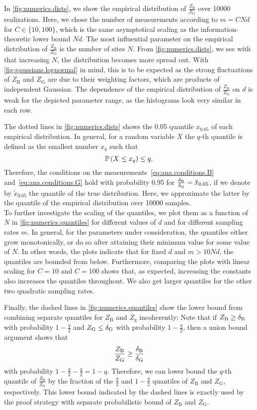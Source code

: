 In \cref{fig:numerics.dists}, we show the empirical distribution of $\frac{Z_\mathrm{{B}}}{Z_\mathrm{G}}$ over 10000 realizations.
Here, we chose the number of measurements according to $m = C N d$ for $C \in \{10, 100\}$, which is the same asymptotical scaling as the information-theoretic lower bound $N d$.
The most influential parameter on the empirical distribution of $\frac{Z_\mathrm{{B}}}{Z_\mathrm{G}}$ is the number of sites $N$.
From \cref{fig:numerics.dists}, we see with that increasing $N$, the distribution becomes more spread out.
With \cref{fig:gaussians.lognormal} in mind, this is to be expected as the strong fluctuations of $Z_\mathrm{B}$ and $Z_\mathrm{G}$ are due to their weighting factors, which are products of independent Gaussian.
The dependence of the empirical distribution of $\frac{Z_\mathrm{{B}}}{Z_\mathrm{G}}$ on $d$ is weak for the depicted parameter range, as the histograms look very similar in each row.

The dotted lines in \cref{fig:numerics.dists} shows the 0.05 quantile $x_{0.05}$ of each empirical distribution.
In general, for a random variable $X$ the $q$-th quantile is defined as the smallest number $x_{q}$ such that
\[
  \label{eq:numerics.quantile}
  \mathbb{P}\left( X \le x_{q} \right) \le q.
\]
Therefore, the conditions on the measurements~\eqref{eq:ana.conditions.B} and~\eqref{eq:ana.conditions.G} hold with probability 0.95 for $\frac{\delta_\mathrm{B}}{\delta_\mathrm{G}} = \tilde x_{0.05}$, if we denote by $\tilde x_{0.05}$ the quantile of the true distribution.
Here, we approximate the latter by the quantile of the empirical distribution over 10000 samples.\\



To further investigate the scaling of the quantiles, we plot them as a function of $N$ in \cref{fig:numerics.quantiles} for different values of $d$ and for different sampling rates $m$.
In general, for the parameters under consideration, the quantiles either grow monotonically, or do so after attaining their minimum value for some value of $N$.
In other words, the plots indicate that for fixed $d$ and $m > 10 N d$, the quantiles are bounded from below.
Furthermore, comparing the plots with linear scaling for $C = 10$ and $C = 100$ shows that, as expected, increasing the constants also increases the quantiles throughout.
We also get larger quantiles for the other two quadratic sampling rates.

Finally, the dashed lines in \cref{fig:numerics.quantiles} show the lower bound from combining separate quantiles for $Z_\mathrm{B}$ and $Z_\mathrm{g}$ incoherently:
Note that if $Z_\mathrm{B} \ge \delta_\mathrm{B}$ with probability $1 - \frac{q}{2}$ and $Z_\mathrm{G} \le \delta_\mathrm{G}$ with probability $1 - \frac{q}{2}$, then a union bound argument shows that
\[
  \frac{Z_\mathrm{B}}{Z_\mathrm{G}} \ge \frac{\delta_\mathrm{B}}{\delta_\mathrm{G}}
\]
with probability $1 - \frac{q}{2} - \frac{q}{2} = 1 - q$.
Therefore, we can lower bound the $q$-th quantile of $\frac{Z_\mathrm{B}}{Z_\mathrm{G}}$ by the fraction of the $\frac{q}{2}$ and $1 - \frac{q}{2}$ quantiles of $Z_\mathrm{B}$ and $Z_\mathrm{G}$, respectively.
This lower bound indicated by the dashed lines is exactly used by the proof strategy with separate probabilistic bound of $Z_\mathrm{B}$ and $Z_\mathrm{G}$.

